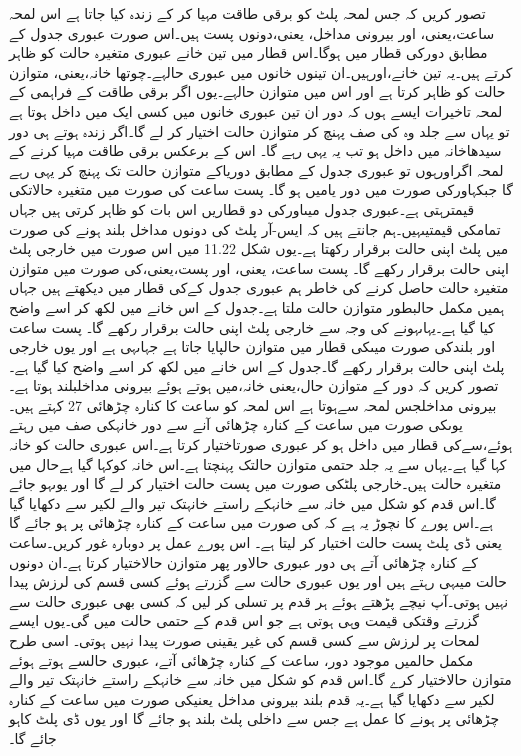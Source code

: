 	تصور کریں کہ جس لمحہ پلٹ کو برقی طاقت مہیا کر کے زندہ کیا جاتا ہے  اس لمحہ  ساعت،یعنی، اور بیرونی مداخل، یعنی،دونوں پست ہیں۔اس صورت عبوری جدول کے مطابق دورکی قطار میں ہوگا۔اس قطار میں تین خانے عبوری متغیرہ حالت کو ظاہر کرتے ہیں۔یہ تین خانے،اورہیں۔ان تینوں خانوں میں عبوری حالہے۔چوتھا خانہ،یعنی، متوازن حالت کو ظاہر کرتا ہے اور اس میں متوازن حالہے۔یوں اگر برقی طاقت کے فراہمی کے لمحہ تاخیرات ایسے ہوں کہ دور ان تین عبوری خانوں میں کسی ایک میں داخل ہوتا ہے تو یہاں سے جلد وہ کی صف پہنچ کر متوازن حالت اختیار کر لے گا۔اگر زندہ ہوتے ہی دور سیدھاخانہ میں داخل ہو تب یہ یہی رہے گا۔
	اس کے برعکس برقی طاقت مہیا کرنے کے لمحہ اگراورہوں تو عبوری جدول کے مطابق دوریاکے متوازن حالت تک پہنچ کر یہی رہے گا جبکہاورکی صورت میں دور یامیں ہو گا۔
	پست ساعت کی صورت میں متغیرہ حالاتکی قیمترہتی ہے۔عبوری جدول میںاورکی دو قطاریں اس بات کو ظاہر کرتی ہیں جہاں تمامکی قیمتیںہیں۔ہم جانتے ہیں کہ ایس-آر پلٹ کی دونوں مداخل بلند ہونے کی صورت میں پلٹ اپنی حالت برقرار رکھتا ہے۔یوں شکل 11.22 میں اس صورت میں خارجی پلٹ اپنی حالت برقرار رکھے گا۔
	پست ساعت، یعنی، اور پست،یعنی،کی صورت میں متوازن متغیرہ حالت حاصل کرنے کی خاطر ہم عبوری جدول کےکی قطار میں دیکھتے ہیں جہاں ہمیں مکمل حالبطور متوازن حالت ملتا ہے۔جدول کے اس خانے میں لکھ کر اسے واضح کیا گیا ہے۔یہاںہونے کی وجہ سے خارجی پلٹ اپنی حالت برقرار رکھے گا۔
	پست ساعت اور بلندکی صورت میںکی قطار میں متوازن حالپایا جاتا ہے جہاںہی ہے اور یوں خارجی پلٹ اپنی حالت برقرار رکھے گا۔جدول کے اس خانے میں لکھ کر اسے واضح کیا گیا ہے۔
	تصور کریں کہ دور کے متوازن حال،یعنی خانہ،میں ہوتے ہوئے بیرونی مداخلبلند ہوتا ہے۔بیرونی مداخلجس لمحہ سےہوتا ہے اس لمحہ کو ساعت کا کنارہ چڑھائی 27 کہتے ہیں۔ یوںکی صورت میں ساعت کے کنارہ چڑھائی آنے سے دور خانہکی صف میں رہتے ہوئے،سےکی قطار میں داخل ہو کر عبوری صورتاختیار کرتا ہے۔اس عبوری حالت کو خانہ کہا گیا ہے۔یہاں سے یہ جلد حتمی متوازن حالتک پہنچتا ہے۔اس خانہ کوکہا گیا ہےحال میں متغیرہ حالت ہیں۔خارجی پلٹکی صورت میں پست حالت اختیار کر لے گا اور یوںہو جائے گا۔اس قدم کو شکل میں خانہ سے  خانہکے راستے خانہتک تیر والے لکیر سے دکھایا گیا ہے۔اس پورے کا نچوڑ یہ ہے کہ کی صورت میں ساعت کے کنارہ چڑھائی پر ہو جائے گا یعنی ڈی پلٹ پست حالت اختیار کر لیتا ہے۔
	اس پورے عمل پر دوبارہ غور کریں۔ساعت کے کنارہ چڑھائی آتے ہی دور عبوری حالاور پھر متوازن حالاختیار کرتا ہے۔ان دونوں حالت میںہی رہتے ہیں اور یوں عبوری حالت سے گزرتے ہوئے کسی قسم کی لرزش پیدا نہیں ہوتی۔آپ نیچے پڑھتے ہوئے ہر قدم پر تسلی کر لیں کہ کسی بھی عبوری حالت سے گزرتے وقتکی قیمت وہی ہوتی ہے جو اس قدم کے حتمی حالت میں گی۔یوں ایسے لمحات پر لرزش سے کسی قسم کی غیر یقینی صورت پیدا نہیں ہوتی۔
		اسی طرح مکمل حالمیں موجود دور، ساعت کے کنارہ چڑھائی آتے، عبوری حالسے ہوتے ہوئے متوازن حالاختیار کرے گا۔اس قدم کو شکل میں خانہ سے  خانہکے راستے خانہتک تیر والے لکیر سے دکھایا گیا ہے۔یہ قدم بلند بیرونی مداخل یعنیکی صورت میں ساعت کے کنارہ چڑھائی پر ہونے کا عمل ہے جس سے داخلی پلٹ بلند ہو جائے گا اور یوں ڈی پلٹ کاہو جائے گا۔
